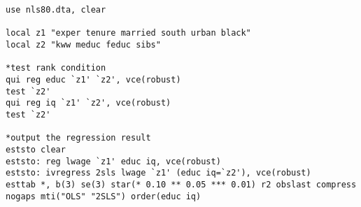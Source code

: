 \begin{lstlisting}
use nls80.dta, clear

local z1 "exper tenure married south urban black"
local z2 "kww meduc feduc sibs"

*test rank condition
qui reg educ `z1' `z2', vce(robust)
test `z2'
qui reg iq `z1' `z2', vce(robust)
test `z2'

*output the regression result
eststo clear
eststo: reg lwage `z1' educ iq, vce(robust)
eststo: ivregress 2sls lwage `z1' (educ iq=`z2'), vce(robust)
esttab *, b(3) se(3) star(* 0.10 ** 0.05 *** 0.01) r2 obslast compress nogaps mti("OLS" "2SLS") order(educ iq)
\end{lstlisting}
